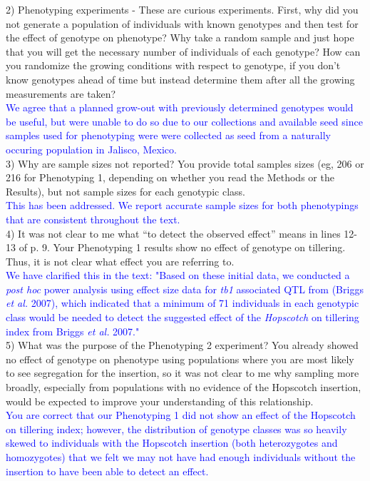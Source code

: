 \documentclass[11pt]{article}
\newcommand{\res}[1]{\noindent \textcolor{blue}{{#1}} \\}
\begin{document}
2) Phenotyping experiments - These are curious experiments.  First, why did you not generate a population of individuals with known genotypes and then test for the effect of genotype on phenotype?  Why take a random sample and just hope that you will get the necessary number of individuals of each genotype?  How can you randomize the growing conditions with respect to genotype, if you don’t know genotypes ahead of time but instead determine them after all the growing measurements are taken?\\

\res{We agree that a planned grow-out with previously determined genotypes would be useful, but were unable to do so due to our collections and available seed since samples used for phenotyping were were collected as seed from a naturally occuring population in Jalisco, Mexico.}

3) Why are sample sizes not reported?  You provide total samples sizes (eg, 206 or 216 for Phenotyping 1, depending on whether you read the Methods or the Results), but not sample sizes for each genotypic class.\\

\res{This has been addressed. We report accurate sample sizes for both phenotypings that are consistent throughout the text.}

4) It was not clear to me what “to detect the observed effect” means in lines 12-13 of p. 9.  Your Phenotyping 1 results show no effect of genotype on tillering.  Thus, it is not clear what effect you are referring to.\\

\res{We have clarified this in the text: "Based on these initial data, we conducted a \emph{post hoc} power analysis using effect size data for \emph{tb1} associated QTL from (Briggs \emph{et al.} 2007), which indicated that a minimum of 71 individuals in each genotypic class would be needed to detect the suggested effect of the \emph{Hopscotch} on tillering index from Briggs \emph{et al.} 2007."}

5) What was the purpose of the Phenotyping 2  experiment?  You already showed no effect of genotype on phenotype using populations where you are most likely to see segregation for the insertion, so it was not clear to me why sampling more broadly, especially from populations with no evidence of the Hopscotch insertion, would be expected to improve your understanding of this relationship.\\

\res{You are correct that our Phenotyping 1 did not show an effect of the Hopscotch on tillering index; however, the distribution of genotype classes was so heavily skewed to individuals with the Hopscotch insertion (both heterozygotes and homozygotes) that we felt we may not have had enough individuals without the insertion to have been able to detect an effect.}
\end{document}
